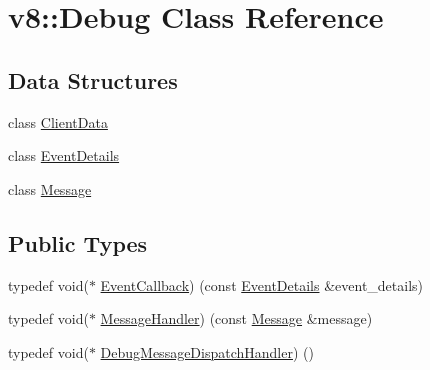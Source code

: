 \hypertarget{classv8_1_1Debug}{}\section{v8\+:\+:Debug Class Reference}
\label{classv8_1_1Debug}
\subsection*{Data Structures}
\begin{DoxyCompactItemize}
\item 
class \hyperlink{classv8_1_1Debug_1_1ClientData}{Client\+Data}
\item 
class \hyperlink{classv8_1_1Debug_1_1EventDetails}{Event\+Details}
\item 
class \hyperlink{classv8_1_1Debug_1_1Message}{Message}
\end{DoxyCompactItemize}
\subsection*{Public Types}
\begin{DoxyCompactItemize}
\item 
typedef void($\ast$ \hyperlink{classv8_1_1Debug_ab53894746a21222796062f0e81ea28d8}{Event\+Callback}) (const \hyperlink{classv8_1_1Debug_1_1EventDetails}{Event\+Details} \&event\+\_\+details)
\item 
typedef void($\ast$ \hyperlink{classv8_1_1Debug_a526826b857bd3e3efa184e12bcebc694}{Message\+Handler}) (const \hyperlink{classv8_1_1Debug_1_1Message}{Message} \&message)
\item 
typedef void($\ast$ \hyperlink{classv8_1_1Debug_a91cd8aa9743e3478bc63fe73abcd557c}{Debug\+Message\+Dispatch\+Handler}) ()
\end{DoxyCompactItemize}
